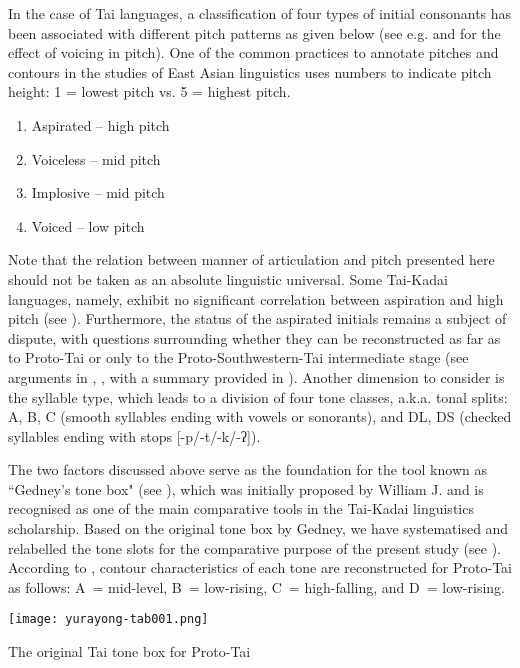\documentclass[output=paper]{langscibook}
\begin{document}
In the case of Tai languages, a classification of four types of initial consonants has been associated with different pitch patterns as given below (see e.g. \citealt{Maddieson1984} and \citealt{Ratliff2015} for the effect of voicing in pitch). One of the common practices to annotate pitches and contours in the studies of East Asian linguistics uses numbers to indicate pitch height: 1 = lowest pitch vs. 5 = highest pitch.

\begin{enumerate}
\item Aspirated – high pitch
\item Voiceless – mid pitch
\item Implosive – mid pitch
\item Voiced – low pitch
\end{enumerate}

Note that the relation between manner of articulation and pitch presented here should not be taken as an absolute linguistic universal. Some Tai-Kadai languages, namely, exhibit no significant correlation between aspiration and high pitch (see \cites[38]{Zhang1980}[188]{Edmondson1990}[170--171]{Liao2016}[18]{ZhuEtAl2016}). Furthermore, the status of the aspirated initials remains a subject of dispute, with questions surrounding whether they can be reconstructed as far as to Proto-Tai or only to the Proto-Southwestern-Tai intermediate stage (see arguments in \citealt{LiangZhang1996}, \citealt{Pittayaporn2009}, with a summary provided in \citealt{Liao2023a}). Another dimension to consider is the syllable type, which leads to a division of four tone classes, a.k.a. tonal splits: A, B, C (smooth syllables ending with vowels or sonorants), and DL, DS (checked syllables ending with stops [-p/-t/-k/-ʔ]).

The two factors discussed above serve as the foundation for the tool known as ``Gedney’s tone box" (see ), which was initially proposed by William J. \citet{Gedney1972} and is recognised as one of the main comparative tools in the Tai-Kadai linguistics scholarship. Based on the original tone box by Gedney, we have systematised and relabelled the tone slots for the comparative purpose of the present study (see ). According to \citet[271]{Pittayaporn2009}, contour characteristics of each tone are reconstructed for Proto-Tai as follows: A~= mid-level, B~= low-rising, C~= high-falling, and D~= low-rising. 

\begin{table}
\texttt{[image: yurayong-tab001.png]}
\caption{The original  Tai tone box for Proto-Tai}
\label{tab:yurayong:1}
\end{table}
\end{document}
